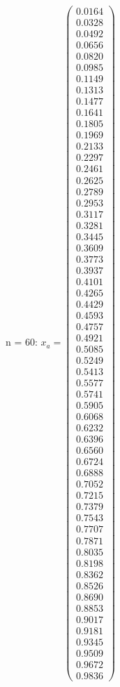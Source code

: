 \documentclass{udpreport}
\begin{document}
\begin{enumerate}
\begin{enumerate}
{{{{\begin{itemize}
				
				n = 60:
				$x_{a} = \left(\begin{array}{c} 0.0164\\ 0.0328\\ 0.0492\\ 0.0656\\ 0.0820\\ 0.0985\\ 0.1149\\ 0.1313\\ 0.1477\\ 0.1641\\ 0.1805\\ 0.1969\\ 0.2133\\ 0.2297\\ 0.2461\\ 0.2625\\ 0.2789\\ 0.2953\\ 0.3117\\ 0.3281\\ 0.3445\\ 0.3609\\ 0.3773\\ 0.3937\\ 0.4101\\ 0.4265\\ 0.4429\\ 0.4593\\ 0.4757\\ 0.4921\\ 0.5085\\ 0.5249\\ 0.5413\\ 0.5577\\ 0.5741\\ 0.5905\\ 0.6068\\ 0.6232\\ 0.6396\\ 0.6560\\ 0.6724\\ 0.6888\\ 0.7052\\ 0.7215\\ 0.7379\\ 0.7543\\ 0.7707\\ 0.7871\\ 0.8035\\ 0.8198\\ 0.8362\\ 0.8526\\ 0.8690\\ 0.8853\\ 0.9017\\ 0.9181\\ 0.9345\\ 0.9509\\ 0.9672\\ 0.9836 \end{array}\right)$

\end{itemize}}}}}
\end{enumerate}
\end{enumerate}
\end{document}
